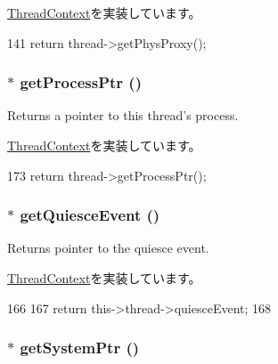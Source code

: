 \hyperlink{classThreadContext_a2c278159cd0cf8983446313f71dad2b4}{ThreadContext}を実装しています。


\begin{DoxyCode}
141 { return thread->getPhysProxy(); }
\end{DoxyCode}
\hypertarget{classInOrderThreadContext_a4b26cb784639047bab9de2b306955c4b}{
\subsubsection[{getProcessPtr}]{$\ast$ getProcessPtr ()}}
\label{classInOrderThreadContext_a4b26cb784639047bab9de2b306955c4b}
Returns a pointer to this thread's process. 

\hyperlink{classThreadContext_a8725d0e5dce89a4a086c7de4bb9d4454}{ThreadContext}を実装しています。


\begin{DoxyCode}
173 { return thread->getProcessPtr(); }
\end{DoxyCode}
\hypertarget{classInOrderThreadContext_a0546f73d19db75274e9d0bc63c5f5908}{
\subsubsection[{getQuiesceEvent}]{$\ast$ getQuiesceEvent ()}}
\label{classInOrderThreadContext_a0546f73d19db75274e9d0bc63c5f5908}
Returns pointer to the quiesce event. 

\hyperlink{classThreadContext_ace05cbb8c4644ab69ad2ce815a259669}{ThreadContext}を実装しています。


\begin{DoxyCode}
166     {
167         return this->thread->quiesceEvent;
168     }
\end{DoxyCode}
\hypertarget{classInOrderThreadContext_af7bdb56e0088b380302741ad9008f321}{
\subsubsection[{getSystemPtr}]{$\ast$ getSystemPtr ()}}
\label{classInOrderThreadContext_af7bdb56e0088b380302741ad9008f321}


